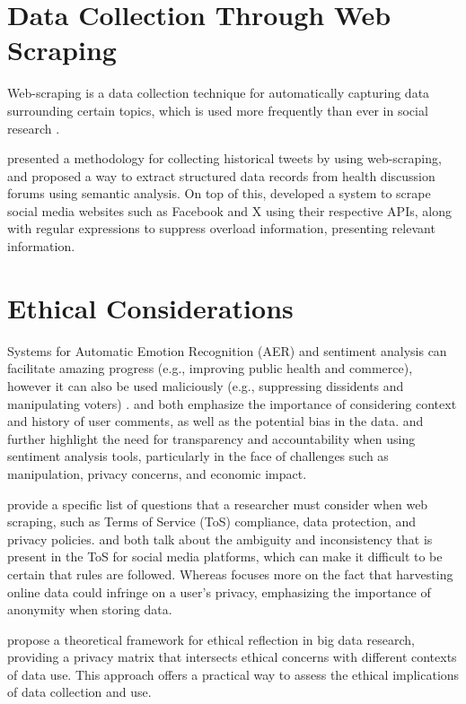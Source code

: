 \section{Data Collection Through Web Scraping}
Web-scraping is a data collection technique for automatically capturing data surrounding certain topics, which is used more frequently than ever in social research \citep{marres2013scraping}.

\citet{hernandez2018web} presented a methodology for collecting historical tweets by using web-scraping, and \citet{baskaran2018automated} proposed a way to extract structured data records from health discussion forums using semantic analysis. On top of this, \citet{dewi2019social} developed a system to scrape social media websites such as Facebook and X using their respective APIs, along with regular expressions to suppress overload information, presenting relevant information.

\section{Ethical Considerations}
Systems for Automatic Emotion Recognition (AER) and sentiment analysis can facilitate amazing progress (e.g., improving public health and commerce), however it can also be used maliciously (e.g., suppressing dissidents and manipulating voters) \citep{mohammad2022ethics}. \citet{veeraselvi2014semantic} and \citet{basiri2014exploiting} both emphasize the importance of considering context and history of user comments, as well as the potential bias in the data. \citet{liu2010sentiment} and \citet{chandra2015sentiment} further highlight the need for transparency and accountability when using sentiment analysis tools, particularly in the face of challenges such as manipulation, privacy concerns, and economic impact.

\citet{krotov2020tutorial} provide a specific list of questions that a researcher must consider when web scraping, such as Terms of Service (ToS) compliance, data protection, and privacy policies. \citet{fiesler2020no} and \citet{mancosu2020you} both talk about the ambiguity and inconsistency that is present in the ToS for social media platforms, which can make it difficult to be certain that rules are followed. Whereas \citet{zia2020there} focuses more on the fact that harvesting online data could infringe on a user's privacy, emphasizing the importance of anonymity when storing data.

\citet{steinmann2016theoretical} propose a theoretical framework for ethical reflection in big data research, providing a privacy matrix that intersects ethical concerns with different contexts of data use. This approach offers a practical way to assess the ethical implications of data collection and use.

